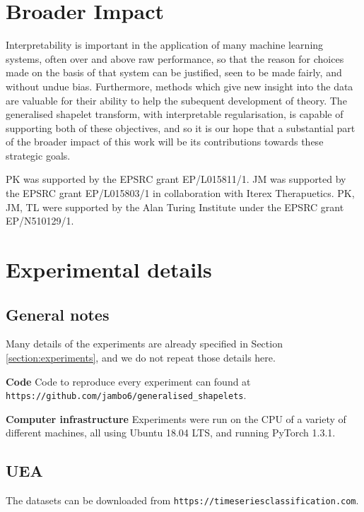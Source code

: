 \documentclass{article}
\theoremstyle{plain}
\theoremstyle{definition}
\newcommand{\boldheading}[1]{

\textbf{#1}\quad}
\begin{document}
	\section*{Broader Impact}
	Interpretability is important in the application of many machine learning systems, often over and above raw performance, so that the reason for choices made on the basis of that system can be justified, seen to be made fairly, and without undue bias. Furthermore, methods which give new insight into the data are valuable for their ability to help the subequent development of theory. The generalised shapelet transform, with interpretable regularisation, is capable of supporting both of these objectives, and so it is our hope that a substantial part of the broader impact of this work will be its contributions towards these strategic goals.
	
	
	\begin{ack}
	PK was supported by the EPSRC grant EP/L015811/1. JM was supported by the EPSRC grant EP/L015803/1 in collaboration with Iterex Therapuetics. PK, JM, TL were supported by the Alan Turing Institute under the EPSRC grant EP/N510129/1.
	\end{ack}
	
	\small
	
	 
	
	\normalsize
	\newpage
	\appendix
	
	\section{Experimental details}\label{appendix:experimental}
	\subsection{General notes}
	Many details of the experiments are already specified in Section \ref{section:experiments}, and we do not repeat those details here.
	
	\boldheading{Code} Code to reproduce every experiment can found at \texttt{https://github.com/jambo6/generalised\_shapelets}.
	
	\boldheading{Computer infrastructure} Experiments were run on the CPU of a variety of different machines, all using Ubuntu 18.04 LTS, and running PyTorch 1.3.1.
	
	\subsection{UEA} \label{apx:uea}
	The datasets can be downloaded from \texttt{https://timeseriesclassification.com}.
\end{document}
